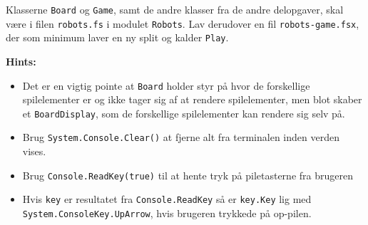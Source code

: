 Klasserne \lstinline{Board} og \lstinline{Game}, samt de andre klasser fra de andre
delopgaver, skal være i filen \texttt{robots.fs} i modulet
\lstinline{Robots}. Lav derudover en fil \texttt{robots-game.fsx}, der
som minimum laver en ny split og kalder \lstinline{Play}.


\textbf{Hints:}
\begin{itemize}
\item Det er en vigtig pointe at \lstinline{Board} holder styr på hvor
  de forskellige spilelementer er og ikke tager sig af at rendere
  spilelementer, men blot skaber et \lstinline{BoardDisplay}, som de
  forskellige spilelementer kan rendere sig selv på.
\item Brug \lstinline{System.Console.Clear()} at fjerne alt fra
  terminalen inden verden vises.
\item Brug \lstinline{Console.ReadKey(true)} til at hente tryk på
  piletasterne fra brugeren
\item Hvis \lstinline{key} er resultatet fra
  \lstinline{Console.ReadKey} så er \lstinline{key.Key} lig med\\
  \lstinline{System.ConsoleKey.UpArrow}, hvis brugeren trykkede på
  op-pilen.
\end{itemize}





